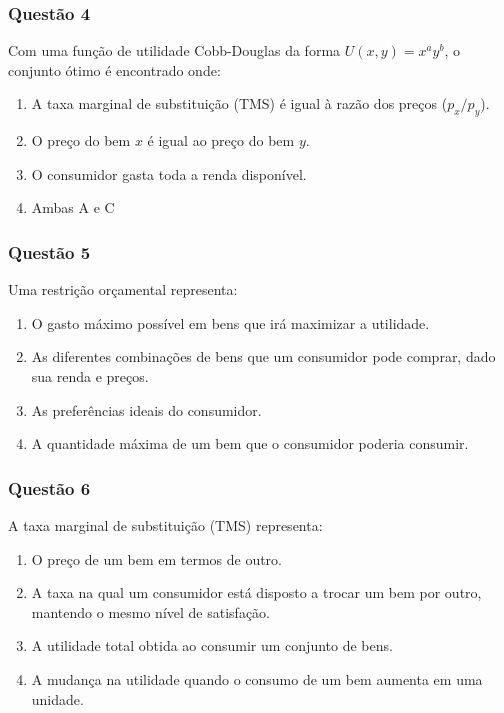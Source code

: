 \begin{frame}
    \frametitle{Questão 4}
    
    Com uma função de utilidade Cobb-Douglas da forma $U(x, y) = x^a y^b$, o conjunto ótimo é encontrado onde: 
    \begin{enumerate}
    
    \item A taxa marginal de substituição (TMS) é igual à razão dos preços ($p_x/p_y$). 
    \item O preço do bem $x$ é igual ao preço do bem $y$. 
    \item O consumidor gasta toda a renda disponível. 
    \item Ambas A e C
\end{enumerate}
\end{frame}
    
\begin{frame}
    \frametitle{Questão 5}
    
    Uma restrição orçamental representa: 
    \begin{enumerate}
    
    \item O gasto máximo possível em bens que irá maximizar a utilidade. 
    \item As diferentes combinações de bens que um consumidor pode comprar, dado sua renda e preços. 
    \item As preferências ideais do consumidor. 
    \item A quantidade máxima de um bem que o consumidor poderia consumir.
\end{enumerate}
\end{frame}

\begin{frame}
    \frametitle{Questão 6}
    
    A taxa marginal de substituição (TMS) representa: 
    \begin{enumerate}
    \item O preço de um bem em termos de outro. 
    \item A taxa na qual um consumidor está disposto a trocar um bem por outro, mantendo o mesmo nível de satisfação. 
    \item A utilidade total obtida ao consumir um conjunto de bens. 
    \item  A mudança na utilidade quando o consumo de um bem aumenta em uma unidade.
\end{enumerate}
\end{frame}
    
